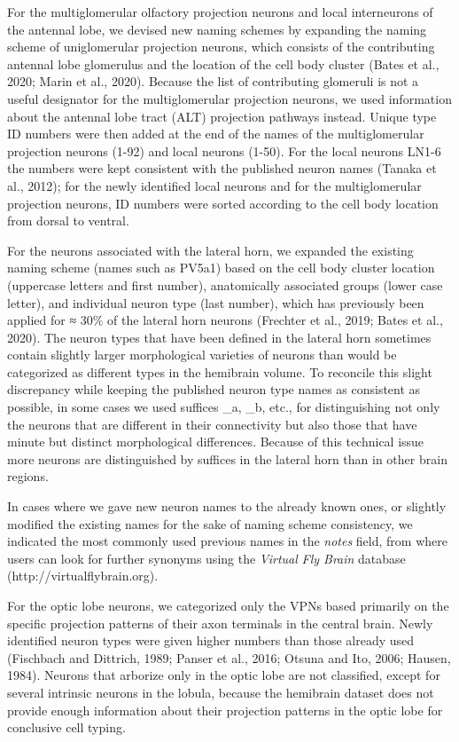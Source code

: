 \documentclass{article}
\begin{document}
For the multiglomerular olfactory projection neurons and local interneurons of the antennal lobe, we devised new naming schemes by expanding the naming scheme of uniglomerular projection neurons, which consists of the contributing antennal lobe glomerulus and the location of the cell body cluster (Bates et al., 2020; Marin et al., 2020). Because the list of contributing glomeruli is not a useful designator for the multiglomerular projection neurons, we used information about the antennal lobe tract (ALT) projection pathways instead. Unique type ID numbers were then added at the end of the names of the multiglomerular projection neurons (1-92) and local neurons (1-50). For the local neurons LN1-6 the numbers were kept consistent with the published neuron names (Tanaka et al., 2012); for the newly identified local neurons and for the multiglomerular projection neurons, ID numbers were sorted according to the cell body location from dorsal to ventral.

For the neurons associated with the lateral horn, we expanded the existing naming scheme (names such as PV5a1) based on the cell body cluster location (uppercase letters and first number), anatomically associated groups (lower case letter), and individual neuron type (last number), which has previously been applied for ≈ 30\% of the lateral horn neurons (Frechter et al., 2019; Bates et al., 2020). The neuron types that have been defined in the lateral horn sometimes contain slightly larger morphological varieties of neurons than would be categorized as different types in the hemibrain volume. To reconcile this slight discrepancy while keeping the published neuron type names as consistent as possible, in some cases we used suffices \_a, \_b, etc., for distinguishing not only the neurons that are different in their connectivity but also those that have minute but distinct morphological differences. Because of this technical issue more neurons are distinguished by suffices in the lateral horn than in other brain regions.

In cases where we gave new neuron names to the already known ones, or slightly modified the existing names for the sake of naming scheme consistency, we indicated the most commonly used previous names in the \emph{notes} field, from where users can look for further synonyms using the \emph{Virtual} \emph{Fly Brain} database (http://virtualflybrain.org).

For the optic lobe neurons, we categorized only the VPNs based primarily on the specific projection patterns of their axon terminals in the central brain. Newly identified neuron types were given higher numbers than those already used (Fischbach and Dittrich, 1989; Panser et al., 2016; Otsuna and Ito, 2006; Hausen, 1984). Neurons that arborize only in the optic lobe are not classified, except for several intrinsic neurons in the lobula, because the hemibrain dataset does not provide enough information about their projection patterns in the optic lobe for conclusive cell typing.
\end{document}
